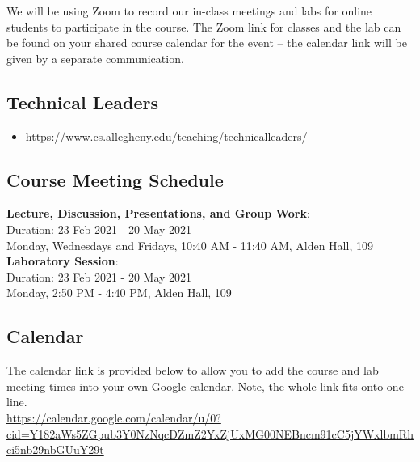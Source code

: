 \documentclass[11pt]{article} %
\begin{document}
We will be using Zoom to record our in-class meetings and labs for online students to participate in the course. The Zoom link for classes and the lab can be found on your shared course calendar for the event -- the calendar link will be given by a separate communication.


\subsection*{\textbf{Technical Leaders}}
	\begin{itemize}
		\item   \url{https://www.cs.allegheny.edu/teaching/technicalleaders/}
	\end{itemize}



\subsection*{\textbf{Course Meeting Schedule}}


\textbf{Lecture, Discussion, Presentations, and Group Work}:\\
\noindent
Duration: 23 Feb 2021 - 20 May 2021\\
Monday, Wednesdays and Fridays, 10:40 AM - 11:40 AM, Alden Hall, 109\\


\noindent
\textbf{Laboratory Session}:\\
Duration: 23 Feb 2021 - 20 May 2021\\
Monday, 2:50 PM - 4:40 PM, Alden Hall, 109\\



\subsection*{\textbf{Calendar}}
The calendar link is provided below to allow you to add the course and lab meeting times into your own Google calendar. Note, the whole link fits onto one line.\\
{\footnotesize
\url{https://calendar.google.com/calendar/u/0?cid=Y182aWs5ZGpub3Y0NzNqcDZmZ2YxZjUxMG00NEBncm91cC5jYWxlbmRhci5nb29nbGUuY29t} }
\end{document}
